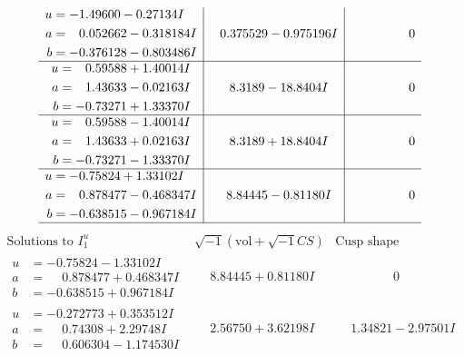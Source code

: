 \documentclass[1p]{elsarticle_modified}
\theoremstyle{definition}
\newcommand{\I}{\sqrt{-1}}
\begin{document}
$$\begin{array}{c|c|c}
\begin{aligned}
u &= -1.49600 - 0.27134 I \\
a &= \phantom{-}0.052662 - 0.318184 I \\
b &= -0.376128 - 0.803486 I\end{aligned}
 & \phantom{-}0.375529 - 0.975196 I & \phantom{-0.000000 } 0 \\ \hline\begin{aligned}
u &= \phantom{-}0.59588 + 1.40014 I \\
a &= \phantom{-}1.43633 - 0.02163 I \\
b &= -0.73271 + 1.33370 I\end{aligned}
 & \phantom{-}8.3189 - 18.8404 I & \phantom{-0.000000 } 0 \\ \hline\begin{aligned}
u &= \phantom{-}0.59588 - 1.40014 I \\
a &= \phantom{-}1.43633 + 0.02163 I \\
b &= -0.73271 - 1.33370 I\end{aligned}
 & \phantom{-}8.3189 + 18.8404 I & \phantom{-0.000000 } 0 \\ \hline\begin{aligned}
u &= -0.75824 + 1.33102 I \\
a &= \phantom{-}0.878477 - 0.468347 I \\
b &= -0.638515 - 0.967184 I\end{aligned}
 & \phantom{-}8.84445 - 0.81180 I & \phantom{-0.000000 } 0\\
 \hline 
 \end{array}$$\newpage$$\begin{array}{c|c|c}  
\text{Solutions to }I^u_{1}& \I (\text{vol} + \sqrt{-1}CS) & \text{Cusp shape}\\
 \hline 
\begin{aligned}
u &= -0.75824 - 1.33102 I \\
a &= \phantom{-}0.878477 + 0.468347 I \\
b &= -0.638515 + 0.967184 I\end{aligned}
 & \phantom{-}8.84445 + 0.81180 I & \phantom{-0.000000 } 0 \\ \hline\begin{aligned}
u &= -0.272773 + 0.353512 I \\
a &= \phantom{-}0.74308 + 2.29748 I \\
b &= \phantom{-}0.606304 - 1.174530 I\end{aligned}
 & \phantom{-}2.56750 + 3.62198 I & \phantom{-}1.34821 - 2.97501 I \\ \hline\begin{aligned}

\end{aligned}
\end{array}$$
\end{document}
